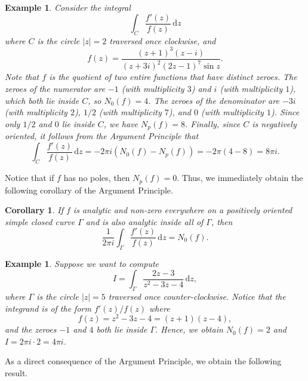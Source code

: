 \documentclass[10pt]{article}
\newcommand{\dd}{\,\mathrm{d}}
\theoremstyle{newstyle}
\newtheorem{cor}[thm]{Corollary}
\newtheorem{exmp}[thm]{Example}
\begin{document}
\begin{exmp}
Consider the integral 
\[ \int_C \frac{f'(z)}{f(z)}\dd z \]
where $C$ is the circle $|z| = 2$ traversed once clockwise, and 
\[ f(z) = \frac{(z+1)^3(z-i)}{(z+3i)^2(2z-1)^7 \sin z}. \]
Note that $f$ is the quotient of two entire functions that have distinct zeroes. The zeroes of the 
numerator are $-1$ (with multiplicity $3$) and $i$ (with multiplicity $1$), which both lie inside $C$, 
so $N_0(f) = 4$. The zeroes of the denominator are $-3i$ (with multiplicity $2$), 
$1/2$ (with multiplicity $7$), and $0$ (with multiplicity $1$). Since only $1/2$ and $0$ 
lie inside $C$, we have $N_p(f) = 8$. Finally, since $C$ is negatively oriented, it follows from the 
Argument Principle that 
\[ \int_C \frac{f'(z)}{f(z)}\dd z = -2\pi i (N_0(f) - N_p(f)) = -2\pi (4-8) = 8\pi i. \]
\end{exmp}

Notice that if $f$ has no poles, then $N_p(f) = 0$. Thus, we immediately obtain the following corollary 
of the Argument Principle. 

\begin{cor}
If $f$ is analytic and non-zero everywhere on a positively oriented simple closed curve $\Gamma$
and is also analytic inside all of $\Gamma$, then 
\[ \frac{1}{2\pi i} \int_\Gamma \frac{f'(z)}{f(z)}\dd z = N_0(f). \]
\end{cor}

\begin{exmp}
Suppose we want to compute 
\[ I = \int_\Gamma \frac{2z-3}{z^2-3z-4}\dd z, \]
where $\Gamma$ is the circle $|z| = 5$ traversed once counter-clockwise. Notice that the integrand 
is of the form $f'(z)/f(z)$ where 
\[ f(z) = z^2 - 3z - 4 = (z+1)(z-4), \]
and the zeroes $-1$ and $4$ both lie inside $\Gamma$. Hence, we obtain 
$N_0(f) = 2$ and $I = 2\pi i \cdot 2 = 4\pi i$. 
\end{exmp}

As a direct consequence of the Argument Principle, we obtain the following result. 
\end{document}
